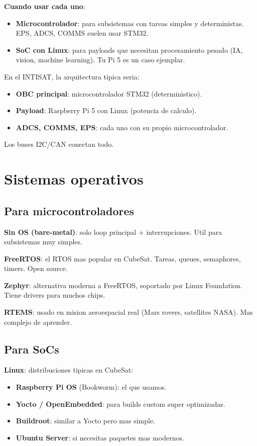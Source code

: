 \documentclass[11pt,a4paper,oneside,openright]{book}
\begin{document}
\textbf{Cuando usar cada uno}:

\begin{itemize}[leftmargin=2em]
  \item \textbf{Microcontrolador}: para subsistemas con tareas simples y
        deterministas. EPS, ADCS, COMMS suelen usar STM32.
  \item \textbf{SoC con Linux}: para payloads que necesitan
        procesamiento pesado (IA, vision, machine learning). Tu Pi 5 es
        un caso ejemplar.
\end{itemize}

\begin{payload}
En el INTISAT, la arquitectura tipica seria:
\begin{itemize}[leftmargin=1em]
  \item \textbf{OBC principal}: microcontrolador STM32 (deterministico).
  \item \textbf{Payload}: Raspberry Pi 5 con Linux (potencia de calculo).
  \item \textbf{ADCS, COMMS, EPS}: cada uno con su propio microcontrolador.
\end{itemize}
Los buses I2C/CAN conectan todo.
\end{payload}

\chapter{Sistemas operativos}

\section{Para microcontroladores}

\textbf{Sin OS (bare-metal)}: solo loop principal + interrupciones. Util
para subsistemas muy simples.

\textbf{FreeRTOS}: el RTOS mas popular en CubeSat. Tareas, queues,
semaphores, timers. Open source.

\textbf{Zephyr}: alternativa moderna a FreeRTOS, soportado por Linux
Foundation. Tiene drivers para muchos chips.

\textbf{RTEMS}: usado en mision aeroespacial real (Mars rovers,
satellites NASA). Mas complejo de aprender.

\section{Para SoCs}

\textbf{Linux}: distribuciones tipicas en CubeSat:
\begin{itemize}[leftmargin=2em]
  \item \textbf{Raspberry Pi OS} (Bookworm): el que usamos.
  \item \textbf{Yocto / OpenEmbedded}: para builds custom super
        optimizadas.
  \item \textbf{Buildroot}: similar a Yocto pero mas simple.
  \item \textbf{Ubuntu Server}: si necesitas paquetes mas modernos.
\end{itemize}
\end{document}
